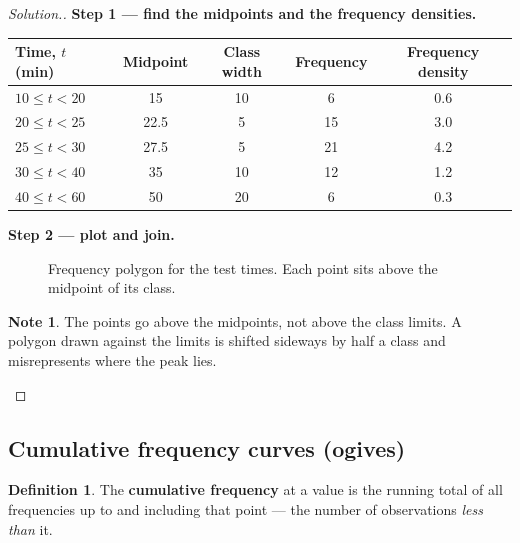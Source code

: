 \documentclass[11pt,a4paper]{article}
\theoremstyle{definition}
\newtheorem{definition}[thm]{Definition}
\newtheorem{note}[thm]{Note}
\newenvironment{solution}
  {\renewcommand{\qedsymbol}{}\begin{proof}[\textit{Solution}.]}
  {\end{proof}}
\begin{document}
\begin{solution}
\textbf{Step 1 --- find the midpoints and the frequency densities.}

\begin{table}[H]
\centering
\begin{tabular}{|l|c|c|c|c|}
\hline
Time, $t$ (min) & Midpoint & Class width & Frequency & Frequency density\\
\hline
$10\leq t<20$ & 15 & 10 & 6 & 0.6\\
$20\leq t<25$ & 22.5 & 5 & 15 & 3.0\\
$25\leq t<30$ & 27.5 & 5 & 21 & 4.2\\
$30\leq t<40$ & 35 & 10 & 12 & 1.2\\
$40\leq t<60$ & 50 & 20 & 6 & 0.3\\
\hline
\end{tabular}
\end{table}

\textbf{Step 2 --- plot and join.}

\begin{figure}[H]
\centering
{}
\caption{Frequency polygon for the test times. Each point sits above the midpoint of its class.}
\end{figure}

\begin{note}
The points go above the midpoints, not above the class limits. A polygon drawn against
the limits is shifted sideways by half a class and misrepresents where the peak lies.
\end{note}
\end{solution}

\subsection{Cumulative frequency curves (ogives)}

\begin{definition}
The \textbf{cumulative frequency} at a value is the running total of all frequencies up
to and including that point --- the number of observations \emph{less than} it.
\end{definition}
\end{document}
